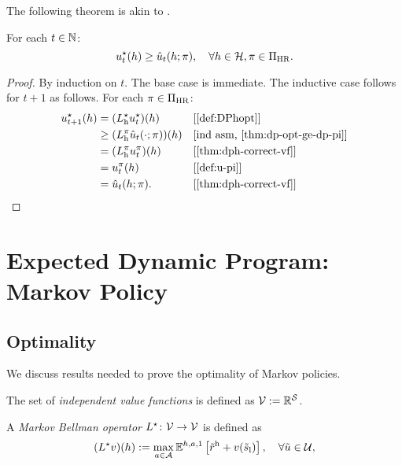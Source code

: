 The following theorem is akin to \citep[theorem~4.3.2]{Puterman2005}.
\begin{theorem}\label{thm:dph-opt-vf-opt}
For each $t\in \mathbb{N}$:
  \[
    u^{\star}_t(h)
    \ge 
    \hat{u}_t(h; \pi), \quad \forall h\in \mathcal{H}, \pi\in \Pi_{\mathrm{HR}}.
  \]
\end{theorem}
\begin{proof}
  By induction on $t$. The base case is immediate. The inductive case follows for $t+1$ as follows. For each $\pi\in \Pi_{\mathrm{HR}}$:
  \begin{align*}
    u_{t+1}\opt(h)
    &= (L_{\mathrm{h}}\opt u_t\opt)(h) && \why{\cref{def:DPhopt}} \\
    &\ge (L_{\mathrm{h}}^{\pi} \hat{u}_t(\cdot; \pi))(h) && \why{ind asm, \cref{thm:dp-opt-ge-dp-pi}} \\
    &= (L_{\mathrm{h}}^{\pi} u_t^{\pi})(h) && \why{\cref{thm:dph-correct-vf}} \\
    &= u_t^{\pi}(h) && \why{\cref{def:u-pi}} \\
    &= \hat{u}_t(h; \pi). && \why{\cref{thm:dph-correct-vf}} \\
  \end{align*}
\end{proof}

\section{Expected Dynamic Program: Markov Policy}

\subsection{Optimality}
We discuss results needed to prove the optimality of Markov policies. 

\begin{definition} \label{def:Values}
  The set of \emph{independent value functions} is defined as $\mathcal{V} := \mathbb{R}^{\mathcal{S}}$.
  \leanok
\end{definition}

\begin{definition}\label{def:DPMopt}
A \emph{Markov Bellman operator} $L^{\star}\colon \mathcal{V} \to \mathcal{V}$ is defined as
\[
(L^{\star}  v)(h)  :=
\max_{a\in \mathcal{A}} \mathbb{E}^{h, a, 1} \left[ \tilde{r}^{\mathrm{h}} + v(\tilde{s}_{\mathrm{l}}) \right], \quad \forall \tilde{u} \in \mathcal{U},
\]
\leanok
\end{definition}

